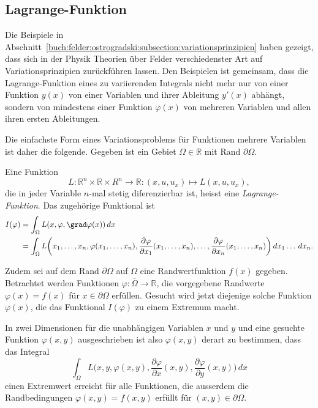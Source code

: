 %
%
\subsection{Lagrange-Funktion}
Die Beispiele in
Abschnitt~\ref{buch:felder:ostrogradski:subsection:variationsprinzipien}
haben gezeigt, dass sich in der Physik Theorien über Felder verschiedenster
Art auf Variationsprinzipien zurückführen lassen.
Den Beispielen ist gemeinsam, dass die Lagrange-Funktion eines zu
variierenden Integrals nicht mehr nur von einer Funktion $y(x)$ von
einer Variablen und ihrer Ableitung $y'(x)$ abhängt, sondern von mindestens
einer Funktion $\varphi(x)$ von mehreren Variablen und allen ihren
ersten Ableitungen.

Die einfachste Form eines Variationsproblems für Funktionen mehrere
Variablen ist daher die folgende.
Gegeben ist ein Gebiet $\Omega\in\mathbb{R}$ mit Rand $\partial\Omega$.

\begin{definition}
Eine Funktion
\[
L
\colon
\mathbb{R}^n\times\mathbb{R}\times{R}^n
\to
\mathbb{R}
:
(x,u,u_x)
\mapsto
L(x,u,u_x),
\]
die in jeder Variable $n$-mal stetig diferenzierbar ist, heisst eine
{\em Lagrange-Funktion}.
Das zugehörige Funktional ist
\begin{equation}
\begin{aligned}
I(\varphi)
&=
\int_{\Omega}
L(x,\varphi,\grad\varphi(x))
\,dx
\\
&=
\int_{\Omega} 
L\biggl(
x_1,\dots,x_n,
\varphi(x_1,\dots,x_n),
\frac{\partial \varphi}{\partial x_1}(x_1,\dots,x_n),
\dots,
\frac{\partial \varphi}{\partial x_n}(x_1,\dots,x_n)
\biggr)
\,dx_1\dots\,dx_n.
\end{aligned}
\label{buch:felder:astrogradski:eqn:Lfunktional}
\end{equation}
\end{definition}

Zudem sei auf dem Rand $\partial\Omega$ auf $\Omega$
eine Randwertfunktion
$f(x)$ gegeben.
Betrachtet werden Funktionen
$\varphi\colon\overline{\Omega}\to \mathbb{R}$,
die vorgegebene Randwerte
\(
\varphi(x) = f(x)
\)
für $x\in\partial\Omega$ erfüllen.
Gesucht wird jetzt diejenige solche Funktion $\varphi(x)$, die das Funktional
$I(\varphi)$ zu einem Extremum macht.

In zwei Dimensionen für die unabhängigen Variablen $x$ und $y$
und eine gesuchte Funktion $\varphi(x,y)$ ausgeschrieben ist also
$\varphi(x,y)$ derart zu bestimmen, dass das Integral
\[
\int_{\Omega}
L\biggl(
x,y,\varphi(x,y),
\frac{\partial\varphi}{\partial x}(x,y),
\frac{\partial\varphi}{\partial y}(x,y)
\biggr)
\,dx
\]
einen Extremwert erreicht für alle Funktionen, die ausserdem die 
Randbedingungen $\varphi(x,y)=f(x,y)$ erfüllt für $(x,y)\in\partial\Omega$.

